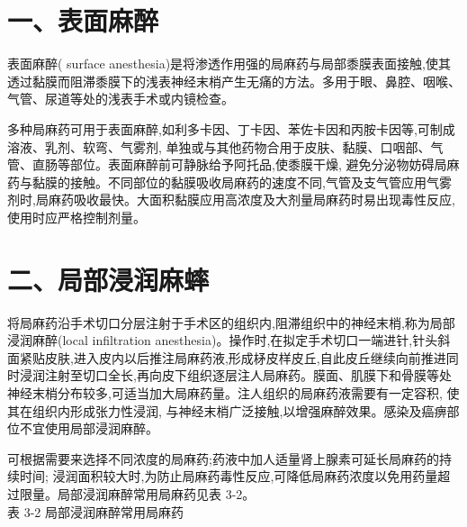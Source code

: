 \documentclass[10pt]{article}
\begin{document}
\section*{一、表面麻醉}
表面麻醉( surface anesthesia)是将渗透作用强的局麻药与局部黍膜表面接触,使其透过黏膜而阻滞黍膜下的浅表神经末梢产生无痛的方法。多用于眼、鼻腔、咽喉、气管、尿道等处的浅表手术或内镜检查。

多种局麻药可用于表面麻醉,如利多卡因、丁卡因、苯佐卡因和丙胺卡因等,可制成溶液、乳剂、软弯、气雾剂, 单独或与其他药物合用于皮肤、黏膜、口咽部、气管、直肠等部位。表面麻醉前可静脉给予阿托品,使黍膜干燥, 避免分泌物妨碍局麻药与黏膜的接触。不同部位的黏膜吸收局麻药的速度不同,气管及支气管应用气雾剂时,局麻药吸收最快。大面积黏膜应用高浓度及大剂量局麻药时易出现毒性反应, 使用时应严格控制剂量。

\section*{二、局部浸润麻蟀}
将局麻药沿手术切口分层注射于手术区的组织内,阻滞组织中的神经末梢,称为局部浸润麻醉(local infiltration anesthesia)。操作时,在拟定手术切口一端进针,针头斜面紧贴皮肤,进入皮内以后推注局麻药液,形成柕皮样皮丘,自此皮丘继续向前推进同时浸润注射至切口全长,再向皮下组织逐层注人局麻药。膜面、肌膜下和骨膜等处神经末梢分布较多,可适当加大局麻药量。注人组织的局麻药液需要有一定容积, 使其在组织内形成张力性浸润, 与神经末梢广泛接触,以增强麻醉效果。感染及癌痹部位不宜使用局部浸润麻醉。

可根据需要来选择不同浓度的局麻药;药液中加人适量肾上腺素可延长局麻药的持续时间; 浸润面积较大时,为防止局麻药毒性反应,可降低局麻药浓度以免用药量超过限量。局部浸润麻醉常用局麻药见表 3-2。\\
表 3-2 局部浸润麻醉常用局麻药
\end{document}
